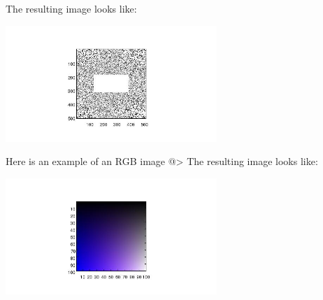 The resulting image looks like:


\centerline{\includegraphics[width=8cm]{image1}}

Here is an example of an RGB image 
@>
The resulting image looks like:


\centerline{\includegraphics[width=8cm]{image2}}

